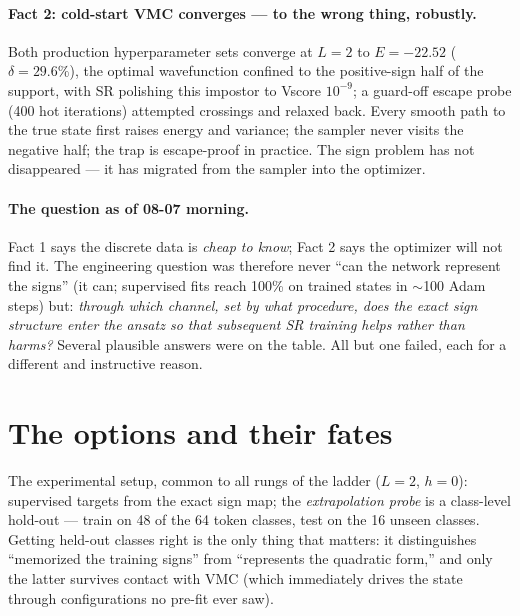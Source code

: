 \documentclass[11pt]{article}
\begin{document}
\paragraph{Fact 2: cold-start VMC converges --- to the wrong thing, robustly.}
Both production hyperparameter sets converge at $L=2$ to $E=-22.52$
($\delta=29.6\%$), the optimal wavefunction confined to the positive-sign half
of the support, with SR polishing this impostor to Vscore $10^{-9}$; a
guard-off escape probe (400 hot iterations) attempted crossings and relaxed
back. Every smooth path to the true state first raises energy and variance;
the sampler never visits the negative half; the trap is escape-proof in
practice. The sign problem has not disappeared --- it has migrated from the
sampler into the optimizer.

\paragraph{The question as of 08-07 morning.}
Fact 1 says the discrete data is \emph{cheap to know}; Fact 2 says the
optimizer will not find it. The engineering question was therefore never
``can the network represent the signs'' (it can; supervised fits reach 100\%
on trained states in $\sim$100 Adam steps) but: \emph{through which channel,
set by what procedure, does the exact sign structure enter the ansatz so that
subsequent SR training helps rather than harms?} Several plausible answers
were on the table. All but one failed, each for a different and instructive
reason.

\section{The options and their fates}
\label{sec:options}

The experimental setup, common to all rungs of the ladder ($L=2$, $h=0$):
supervised targets from the exact sign map; the \emph{extrapolation probe} is
a class-level hold-out --- train on 48 of the 64 token classes, test on the 16
unseen classes. Getting held-out classes right is the only thing that
matters: it distinguishes ``memorized the training signs'' from ``represents
the quadratic form,'' and only the latter survives contact with VMC (which
immediately drives the state through configurations no pre-fit ever saw).
\end{document}
